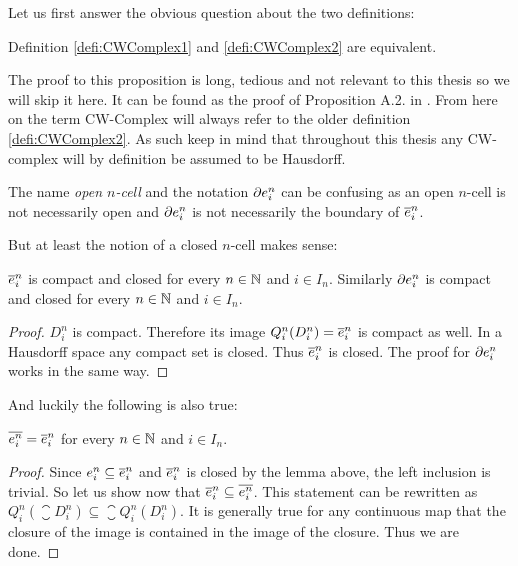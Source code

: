 Let us first answer the obvious question about the two definitions:

\begin{prop}
    Definition \ref{defi:CWComplex1} and \ref{defi:CWComplex2} are equivalent.
\end{prop}

The proof to this proposition is long, tedious and not relevant to this thesis so we will skip it here.
It can be found as the proof of Proposition A.2. in \cite{Hatcher2001}.
From here on the term CW-Complex will always refer to the older definition \ref{defi:CWComplex2}.
As such keep in mind that throughout this thesis any CW-complex will by definition be assumed to be Hausdorff.

\begin{rem}
    The name \emph{open $n$-cell} and the notation $\cellFrontier{n}{i}$ can be confusing as an open $n$-cell is not necessarily open and $\cellFrontier{n}{i}$  is not necessarily the boundary of $\closedCell{n}{i}$.
\end{rem}

But at least the notion of a closed $n$-cell makes sense:

\begin{lem}\label{lem:closedCellclosed}
    $\closedCell{n}{i}$ is compact and closed for every $n \in \bN$ and $i \in I_n$.
    Similarly $\cellFrontier{n}{i}$ is compact and closed for every $n \in \bN$ and $i \in I_n$.
\end{lem}
\begin{proof}
    $D_i^n$ is compact.
    Therefore its image $Q_i^n(D_i^n) = \closedCell{n}{i}$ is compact as well.
    In a Hausdorff space any compact set is closed.
    Thus $\closedCell{n}{i}$ is closed.
    The proof for $\cellFrontier{n}{i}$ works in the same way.
\end{proof}

And luckily the following is also true:

\begin{lem}
    $\closure{\openCell{n}{i}} = \closedCell{n}{i}$ for every $n \in \bN$ and $i \in I_n$.
\end{lem}
\begin{proof}
    Since $\openCell{n}{i} \subseteq \closedCell{n}{i}$ and $\closedCell{n}{i}$ is closed by the lemma above, the left inclusion is trivial.
    So let us show now that $\closedCell{n}{i} \subseteq \closure{\openCell{n}{i}}$.
    This statement can be rewritten as $Q_i^n \left ( \closure{D_i^n} \right ) \subseteq \closure{Q_i^n(D_i^n)}$.
    It is generally true for any continuous map that the closure of the image is contained in the image of the closure.
    Thus we are done.
\end{proof}

